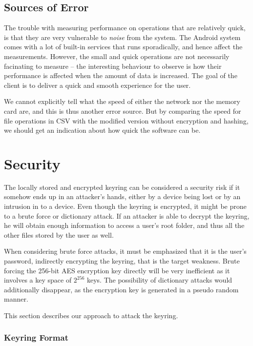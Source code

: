 \documentclass[pdftex,english,10pt,b5paper,twoside]{book}
\begin{document}
\subsection{Sources of Error}

The trouble with measuring performance on operations that are relatively quick,
is that they are very vulnerable to \emph{noise} from the system. The Android
system comes with a lot of built-in services that runs sporadically, and hence
affect the measurements. However, the small and quick operations are not
necessarily facinating to measure -- the interesting behaviour to observe is
how their performance is affected when the amount of data is increased. The
goal of the client is to deliver a quick and smooth experience for the user.

We cannot explicitly tell what the speed of either the network nor the memory
card are, and this is thus another error source. But by comparing the speed for
file operations in \ac{CSV} with the modified version without encryption and
hashing, we should get an indication about how quick the software can be.

\section{Security}
\label{sec:BFLK}

The locally stored and encrypted keyring can be considered a security risk if
it somehow ends up in an attacker's hands, either by a device being lost or by
an intrusion in to a device. Even though the keyring is encrypted, it might be
prone to a brute force or dictionary attack. If an attacker is able to decrypt
the keyring, he will obtain enough information to access a user's root folder,
and thus all the other files stored by the user as well.

When considering brute force attacks, it must be emphasized that it is the
user's password, indirectly encrypting the keyring, that is the target weakness.
Brute forcing the 256-bit AES encryption key directly will be very inefficient
as it involves a key space of $2^{256}$ keys. The possibility of dictionary
attacks would additionally disappear, as the encryption key is generated in a
pseudo random manner.

This section describes our approach to attack the keyring.

\subsubsection{Keyring Format}
\end{document}
